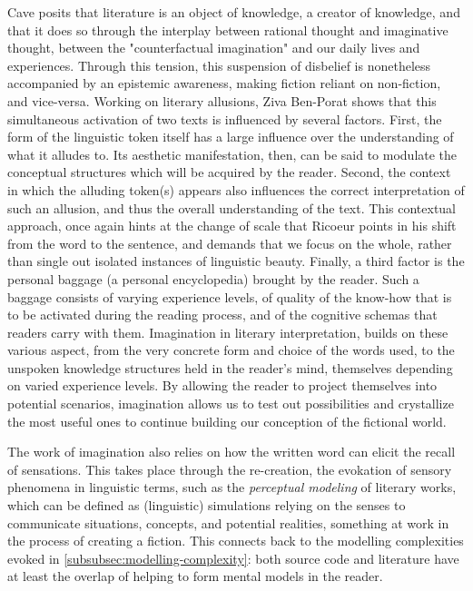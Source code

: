 Cave posits that literature is an object of knowledge, a creator of knowledge, and that it does so through the interplay between rational thought and imaginative thought, between the "counterfactual imagination" and our daily lives and experiences. Through this tension, this suspension of disbelief is nonetheless accompanied by an epistemic awareness, making fiction reliant on non-fiction, and vice-versa. Working on literary allusions, Ziva Ben-Porat shows that this simultaneous activation of two texts is influenced by several factors. First, the form of the linguistic token itself has a large influence over the understanding of what it alludes to. Its aesthetic manifestation, then, can be said to modulate the conceptual structures which will be acquired by the reader. Second, the context in which the alluding token(s) appears also influences the correct interpretation of such an allusion, and thus the overall understanding of the text. This contextual approach, once again hints at the change of scale that Ricoeur points in his shift from the word to the sentence, and demands that we focus on the whole, rather than single out isolated instances of linguistic beauty. Finally, a third factor is the personal baggage (a personal encyclopedia) brought by the reader. Such a baggage consists of varying experience levels, of quality of the know-how that is to be activated during the reading process, and of the cognitive schemas that readers carry with them. Imagination in literary interpretation, builds on these various aspect, from the very concrete form and choice of the words used, to the unspoken knowledge structures held in the reader's mind, themselves depending on varied experience levels. By allowing the reader to project themselves into potential scenarios, imagination allows us to test out possibilities and crystallize the most useful ones to continue building our conception of the fictional world.

The work of imagination also relies on how the written word can elicit the recall of sensations. This takes place through the re-creation, the evokation of sensory phenomena in linguistic terms, such as the \emph{perceptual modeling} of literary works, which can be defined as (linguistic) simulations relying on the senses to communicate situations, concepts, and potential realities, something at work in the process of creating a fiction. This connects back to the modelling complexities evoked in \ref{subsubsec:modelling-complexity}: both source code and literature have at least the overlap of helping to form mental models in the reader.

